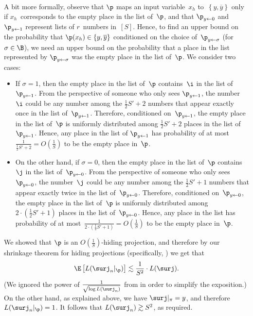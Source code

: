 A bit more formally, observe that $\p$ maps an input variable~$x_{h}$
to~$\left\{ y,\overline{y}\right\} $ only if $x_{h}$~corresponds
to the empty place in the list of~$\p$, and that $\p_{y\gets0}$
and $\p_{y\gets1}$ represent lists of $r$~numbers in~$\left[S\right]$.
Hence, to %
find an upper bound on  %
the probability that 
$\p(x_{h})\in\left\{ y,\overline{y}\right\} $
conditioned on the choice of~$\p_{y\gets\sigma}$ (for $\sigma\in\B$),
we %
need an upper bound on  %
the probability that a place in the list represented
by $\p_{y\gets\sigma}$ was the empty place in the list of~$\p$.
We consider two cases:
\begin{itemize}
\item If $\sigma=1$, then the empty place in the list of~$\p$ contains~$\i$
in the list of~$\p_{y\gets1}$. From the perspective of someone who
only sees $\p_{y\gets1}$, the number~$\i$ could be any number among
the $\frac{1}{2}S'+2$ numbers that appear exactly once in the list
of~$\p_{y\gets1}$. Therefore, conditioned on~$\p_{y\gets1}$, the
empty place in the list of~$\p$ is uniformly distributed among $\frac{1}{2}S'+2$
places in the list of~$\p_{y\gets1}$. Hence, any place in the list
of $\p_{y\gets1}$ has probability of at most~$\frac{1}{\frac{1}{2}S'+2}=O\left(\frac{1}{S}\right)$
to be the empty place in~$\p$.
\item On the other hand, if $\sigma=0$, %
%
%
%
then the empty place in the list
of~$\p$ contains~$\j$ in the list of~$\p_{y\gets0}$. From the
perspective of someone who only sees~$\p_{y\gets0}$, the number~$\j$
could be any number among the $\frac{1}{2}S'+1$ numbers that appear
exactly twice in the list of~$\p_{y\gets0}$. Therefore, conditioned
on~$\p_{y\gets0}$, the empty place in the list of~$\p$ is uniformly
distributed among $2\cdot\left(\frac{1}{2}S'+1\right)$ places in
the list of~$\p_{y\gets0}$. Hence, any place in the list has probability
of at most~$\frac{1}{2\cdot\left(\frac{1}{2}S'+1\right)}=O\left(\frac{1}{S}\right)$
to be the empty place in~$\p$.
\end{itemize}
We showed that $\p$ is an $O(\frac{1}{S})$-hiding projection, and
therefore by our shrinkage theorem for hiding projections (specifically,
) we get that
\[
\E\left[L(\surj_{n}|_{\p})\right]\lesssim\frac{1}{S^{2}}\cdot L(\surj).
\]
(We ignored the power of $\frac{1}{\sqrt{\log L(\surj_{n})}}$ from
 in order to simplify the exposition.)
On the other hand, as explained above, we have $\surj|_{\pi}=y$,
and therefore $L(\surj_{n}|_{\p})=1$. It follows that $L(\surj_{n})\gtrsim S^{2}$, as
required.

